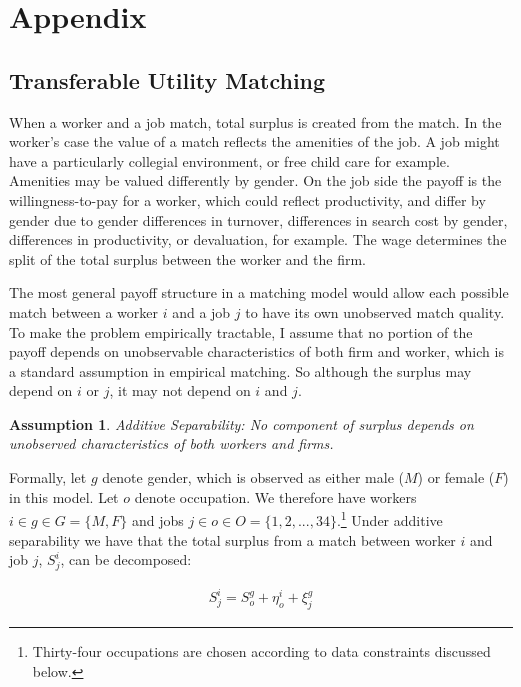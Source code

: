 \documentclass[12pt]{article}
\newtheorem{assumption}{Assumption}
\begin{document}


%

\clearpage
\newpage
\section{Appendix}

\subsection{Transferable Utility Matching}
When a worker and a job match, total surplus is created from the match. In the worker's case the value of a match reflects the amenities of the job. A job might have a particularly collegial environment, or free child care for example. Amenities may be valued differently by gender. On the job side the payoff is the willingness-to-pay for a worker, which could reflect productivity, and differ by gender due to gender differences in turnover, differences in search cost by gender, differences in productivity, or devaluation, for example. The wage determines the split of the total surplus between the worker and the firm.

The most general payoff structure in a matching model would allow each possible match between a worker $i$ and a job $j$ to have its own unobserved match quality. To make the problem empirically tractable, I assume that no portion of the payoff depends on unobservable characteristics of both firm and worker, which is a standard assumption in empirical matching. So although the surplus may depend on $i$ or $j$, it may not depend on $i$ and $j$.

\begin{assumption}
Additive Separability: No component of surplus depends on unobserved characteristics of both workers and firms.
\end{assumption}

Formally, let $g$ denote gender, which is observed as either male ($M$) or female ($F$) in this model. Let $o$ denote occupation. We therefore have workers $i \in g \in G= \{M,F\}$ and jobs $j \in o \in O = \{1,2,...,34\}$.\footnote{Thirty-four occupations are chosen according to data constraints discussed below.} Under additive separability we have that the total surplus from a match between worker $i$ and job $j$, $S^i_j$, can be decomposed:

\begin{align}
S^i_j = S^g_o + \eta^i_o + \xi^g_j
\end{align}
\end{document}
